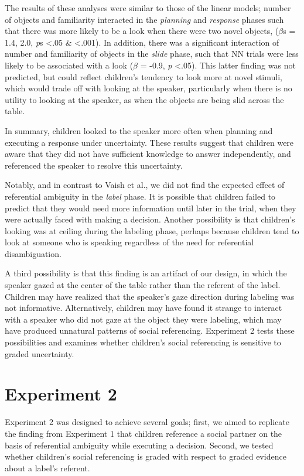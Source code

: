 \documentclass[a4paper,man,apacite,floatsintext]{apa6}
\begin{document}
The results of these analyses were similar to those of the linear
models; number of objects and familiarity interacted in the
\emph{planning} and \emph{response} phases such that there was more
likely to be a look when there were two novel objects, (\(\beta\)s =
1.4, 2.0, \emph{p}s \textless{}.05 \& \textless{}.001). In addition,
there was a significant interaction of number and familiarity of objects
in the \emph{slide} phase, such that NN trials were less likely to be
associated with a look (\(\beta\) = -0.9, \emph{p} \textless{}.05). This
latter finding was not predicted, but could reflect children's tendency
to look more at novel stimuli, which would trade off with looking at the
speaker, particularly when there is no utility to looking at the
speaker, as when the objects are being slid across the table.

In summary, children looked to the speaker more often when planning and
executing a response under uncertainty. These results suggest that
children were aware that they did not have sufficient knowledge to
answer independently, and referenced the speaker to resolve this
uncertainty.

Notably, and in contrast to Vaish et al., we did not find the expected
effect of referential ambiguity in the \emph{label} phase. It is
possible that children failed to predict that they would need more
information until later in the trial, when they were actually faced with
making a decision. Another possibility is that children's looking was at
ceiling during the labeling phase, perhaps because children tend to look
at someone who is speaking regardless of the need for referential
disambiguation.

A third possibility is that this finding is an artifact of our design,
in which the speaker gazed at the center of the table rather than the
referent of the label. Children may have realized that the speaker's
gaze direction during labeling was not informative. Alternatively,
children may have found it strange to interact with a speaker who did
not gaze at the object they were labeling, which may have produced
unnatural patterns of social referencing. Experiment 2 tests these
possibilities and examines whether children's social referencing is
sensitive to graded uncertainty.

\section{Experiment 2}\label{experiment-2}

Experiment 2 was designed to achieve several goals; first, we aimed to
replicate the finding from Experiment 1 that children reference a social
partner on the basis of referential ambiguity while executing a
decision. Second, we tested whether children's social referencing is
graded with respect to graded evidence about a label's referent.
\end{document}
